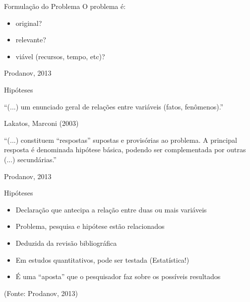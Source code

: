 \documentclass{beamer}
\begin{document}
\begin{frame}{Formulação do Problema}
O problema é:
  \begin{itemize}
  \item original?
  \item relevante?
  \item viável (recursos, tempo, etc)?
  \end{itemize}
Prodanov, 2013
\end{frame}

\begin{frame}{Hipóteses}
  \begin{block}{}
    ``(...) um enunciado geral de \alert{relações entre variáveis}
    (fatos, fenômenos).''

\bigskip

Lakatos, Marconi (2003)
  \end{block}
  \begin{block}{}
    ``(...) constituem ``respostas'' supostas e provisórias ao
    problema. A principal resposta é denominada hipótese básica,
    podendo ser complementada por outras (...) secundárias.''

    \bigskip
    Prodanov, 2013
  \end{block}
\end{frame}

\begin{frame}{Hipóteses}
  \begin{itemize}
  \item Declaração que antecipa a relação entre duas ou mais variáveis
  \item Problema, pesquisa e hipótese estão relacionados
  \item Deduzida da revisão bibliográfica
  \item Em estudos quantitativos, pode ser testada (Estatística!)
  \item É uma ``aposta'' que o pesquisador faz sobre os possíveis
    resultados
  \end{itemize}
  (Fonte: Prodanov, 2013)
\end{frame}
\end{document}
